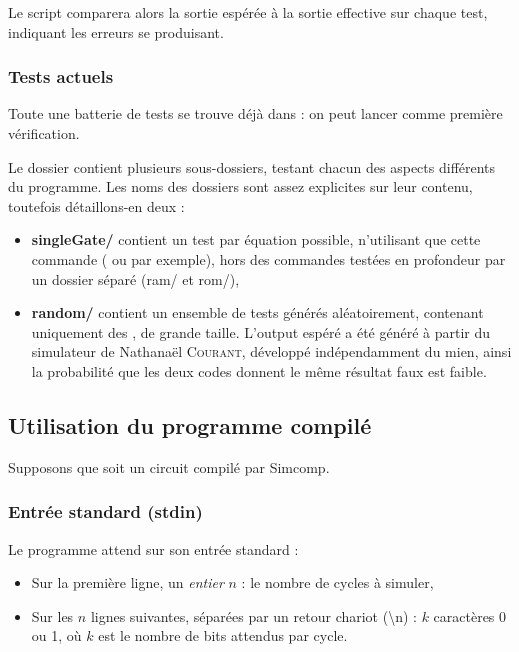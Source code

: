\documentclass[11pt,a4paper]{article}
\begin{document}
Le script comparera alors la sortie espérée à la sortie effective sur chaque test, indiquant les erreurs se produisant.

\subsubsection*{Tests actuels}

Toute une batterie de tests se trouve déjà dans  : on peut lancer  comme première vérification.

Le dossier  contient plusieurs sous-dossiers, testant chacun des aspects différents du programme. Les noms des dossiers sont assez explicites sur leur contenu, toutefois détaillons-en deux :

\begin{itemize}
\item \textbf{singleGate/} contient un test par équation possible, n'utilisant que cette commande ( ou  par exemple), hors des commandes testées en profondeur par un dossier séparé (ram/ et rom/),
\item \textbf{random/} contient un ensemble de tests générés aléatoirement, contenant uniquement des , de grande taille. L'output espéré a été généré à partir du simulateur de Nathanaël \textsc{Courant}, développé indépendamment du mien, ainsi la probabilité que les deux codes donnent le même résultat faux est faible.
\end{itemize}


\subsection{Utilisation du programme compilé} \label{sec:i/o}

Supposons que  soit un circuit compilé par Simcomp.

\subsubsection*{Entrée standard (stdin)}

Le programme attend sur son entrée standard :

\begin{itemize}
\item Sur la première ligne, un \emph{entier} $n$ : le nombre de cycles à simuler,
\item Sur les $n$ lignes suivantes, séparées par un retour chariot (\textbackslash n) : $k$ caractères 0 ou 1, où $k$ est le nombre de bits attendus par cycle.
\end{itemize}
\end{document}
